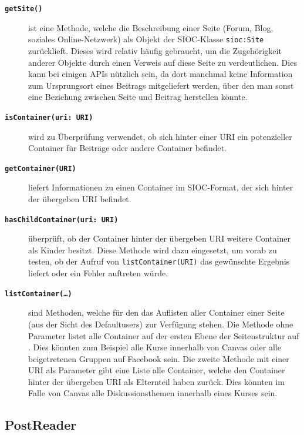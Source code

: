 \begin{description}
    \item[\textbf{\texttt{getSite()}}] ist eine Methode, welche die Beschreibung einer Seite (Forum, Blog, soziales Online-Netzwerk) als Objekt der SIOC-Klasse \texttt{sioc:Site} zurücklieft. Dieses wird relativ häufig gebraucht, um die Zugehörigkeit anderer Objekte durch einen Verweis auf diese Seite zu verdeutlichen. Dies kann bei einigen APIs nützlich sein, da dort manchmal keine Information zum Ursprungsort eines Beitrags mitgeliefert werden, über den man sonst eine Beziehung zwischen Seite und Beitrag herstellen könnte.

    \item[\textbf{\texttt{isContainer(uri: URI)}}] wird zu Überprüfung verwendet, ob sich hinter einer URI ein potenzieller Container für Beiträge oder andere Container befindet. 

    \item[\textbf{\texttt{getContainer(URI)}}] liefert Informationen zu einen Container im SIOC-Format, der sich hinter der übergeben URI befindet.

    \item[\textbf{\texttt{hasChildContainer(uri: URI)}}] überprüft, ob der Container hinter der übergeben URI weitere Container als Kinder besitzt. Diese Methode wird dazu eingesetzt, um vorab zu testen, ob der Aufruf von \texttt{listContainer(URI)} das gewünschte Ergebnis liefert oder ein Fehler auftreten würde. 

    \item[\textbf{\texttt{listContainer(\dots)}}] sind Methoden, welche für den das Auflisten aller Container einer Seite (aus der Sicht des Defaultusers) zur Verfügung stehen. Die Methode ohne Parameter listet alle Container auf der ersten Ebene der Seitenstruktur auf . Dies könnten zum Beispiel alle Kurse innerhalb von Canvas oder alle beigetretenen Gruppen auf Facebook sein. Die zweite Methode mit einer URI als Parameter gibt eine Liste alle Container, welche den Container hinter der übergeben URI als Elternteil haben zurück. Dies könnten im Falle von Canvas alle Diskussionsthemen innerhalb eines Kurses sein.
\end{description}


\subsection{PostReader} %
\label{sub:postreader}

